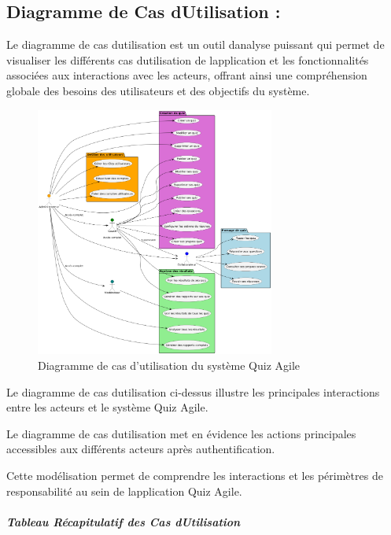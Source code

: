 \documentclass[12pt,a4paper,twoside]{report}
\begin{document}
\hypertarget{diagramme-de-cas-dutilisation}{%
\subsection{Diagramme de Cas d\textquotesingle Utilisation
:}\label{diagramme-de-cas-dutilisation}}

Le diagramme de cas d\textquotesingle utilisation est un outil
d\textquotesingle analyse puissant qui permet de visualiser les
différents cas d\textquotesingle utilisation de
l\textquotesingle application et les fonctionnalités associées aux
interactions avec les acteurs, offrant ainsi une compréhension globale
des besoins des utilisateurs et des objectifs du système.

\begin{figure}[htbp]
    \centering
    \includegraphics[width=0.7\textwidth]{latex_media/media/image14.png}
    \caption{Diagramme de cas d'utilisation du système Quiz Agile}
    \label{fig:cas-utilisation}
\end{figure}

Le diagramme de cas d\textquotesingle utilisation ci-dessus illustre les principales interactions entre les acteurs et le système Quiz Agile.

Le diagramme de cas d\textquotesingle utilisation met en évidence les
actions principales accessibles aux différents acteurs après
authentification.

Cette modélisation permet de comprendre les interactions et les
périmètres de responsabilité au sein de l\textquotesingle application
Quiz Agile.

\hypertarget{tableau-ruxe9capitulatif-des-cas-dutilisation}{%
\subparagraph{Tableau Récapitulatif des Cas
d\textquotesingle Utilisation}\label{tableau-ruxe9capitulatif-des-cas-dutilisation}}
\end{document}
